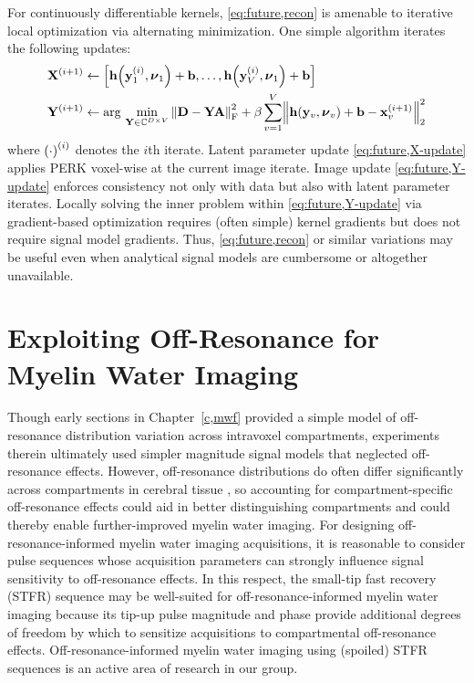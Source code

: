 For continuously differentiable kernels,
\eqref{eq:future,recon} is amenable 
to iterative local optimization 
via alternating minimization.
One simple algorithm iterates
the following updates:
\begin{align}
	\iter{\bmX}{i+1} &\gets
		\brac{%
			\bmh\paren{\iter{\bmy}{i}_1,\bmnu_1}+\bmb,
			\dots,
			\bmh\paren{\iter{\bmy}{i}_V,\bmnu_1}+\bmb
		}%
		\label{eq:future,X-update}
		\\
	\iter{\bmY}{i+1} &\gets
		\argmin{%
			\bmY \in \complexes{D \times V}
		}%
		\frob{\bmD-\bmY\bmA}^2 + 
			\beta \sum_{v=1}^V \norm{%
				\bmh\paren{\bmy_v,\bmnu_v}+\bmb-\iter{\bmx}{i+1}_v
			}^2_2%
		\label{eq:future,Y-update}		
\end{align}
where $\iter{\paren{\cdot}}{i}$ denotes the $i$th iterate.
Latent parameter update \eqref{eq:future,X-update}
applies PERK voxel-wise
at the current image iterate.
Image update \eqref{eq:future,Y-update}
enforces consistency 
not only with data
but also with latent parameter iterates.
Locally solving the inner problem 
within \eqref{eq:future,Y-update}
via gradient-based optimization
requires (often simple) kernel gradients
but does not require signal model gradients.
Thus, 
\eqref{eq:future,recon} or similar variations
may be useful even when analytical signal models
are cumbersome or altogether unavailable.
 
\section{Exploiting Off-Resonance for Myelin Water Imaging}
\label{s,future,off-res}

Though early sections in Chapter~\ref{c,mwf} 
provided a simple model  
of off-resonance distribution variation 
across intravoxel compartments,
experiments therein 
ultimately used simpler magnitude signal models
that neglected off-resonance effects.
However,
off-resonance distributions
do often differ significantly 
across compartments
in cerebral tissue \cite{miller:10:aot-1,miller:10:aot-2},
so accounting for compartment-specific off-resonance effects
could aid in better distinguishing compartments
and could thereby enable further-improved myelin water imaging.
For designing off-resonance-informed myelin water imaging acquisitions,
it is reasonable
to consider pulse sequences
whose acquisition parameters
can strongly influence signal sensitivity 
to off-resonance effects.
In this respect,
the small-tip fast recovery (STFR) sequence \cite{nielsen:13:stf}
may be well-suited for off-resonance-informed myelin water imaging
because its tip-up pulse magnitude and phase
provide additional degrees of freedom
by which to sensitize acquisitions
to compartmental off-resonance effects.
Off-resonance-informed myelin water imaging
using (spoiled) STFR sequences
is an active area of research 
in our group.

